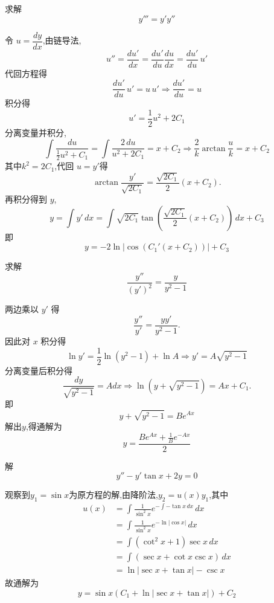 \begin{questions}
    \question 求解
    \[
    y''' = y'y''
    \]
    \begin{solution}
        令 $u=\dfrac{dy}{dx}$,由链导法,
        \[
        u'' = \frac{du'}{dx} = \frac{du'}{du}\frac{du}{dx} = \frac{du'}{du}\,u'
        \]
        代回方程得
        \[
        \frac{du'}{du}\,u' = u\,u' \Rightarrow \frac{du'}{du} = u
        \]
        积分得
        \[
        u' = \frac{1}{2}u^2 + 2C_1
        \]
        分离变量并积分,
        \[
        \int \frac{du}{\frac12 u^2 + C_1} = \int \frac{2\,du}{u^2 + 2C_1}= x + C_2 \Rightarrow \frac{2}{k}\arctan\!\frac{u}{k} = x + C_2
        \]
        其中$k^2 = 2C_1$,代回 $u=y'$得
        \[
        \arctan\frac{y'}{\sqrt{2C_1}} = \frac{\sqrt{2C_1}}{2}(x+C_2).
        \]
        再积分得到 $y$,
        \[
        y = \int y'\,dx = \int \sqrt{2C_1}\tan\left(\frac{\sqrt{2C_1}}{2}(x+C_2)\right)\,dx + C_3
        \]
        即
        \[
        y = -2\ln\left|\cos\left(C_1'(x+C_2)\right)\right| + C_3
        \]
    \end{solution}

    \question 求解
    \[
    \frac{y''}{(y')^2} = \frac{y}{y^2 - 1}
    \]
    \begin{solution}
        两边乘以 $y'$ 得
        \[
        \frac{y''}{y'} = \frac{y y'}{y^2 - 1}.
        \]
        因此对 $x$ 积分得
        \[
        \ln y' = \frac12 \ln(y^2-1) + \ln A \Rightarrow y' = A \sqrt{y^2 - 1}
        \]
        分离变量后积分得
        \[
        \frac{dy}{\sqrt{y^2-1}} = A dx \Rightarrow \ln(y + \sqrt{y^2-1}) = A x + C_1.
        \]
        即
        \[
        y + \sqrt{y^2-1} = B e^{A x}
        \]
        解出$y$,得通解为
        \[
        y = \frac{B e^{A x} + \frac{1}{B} e^{-A x}}{2}
        \]
    \end{solution}

    \question 解
    \[
    y'' - y'\tan x + 2y = 0
    \]
    \begin{solution}
        观察到$y_1=\sin x$为原方程的解,由降阶法,$y_2=u(x)y_1$,其中
        \begin{align*}
        u(x)&=\int \frac{1}{\sin^2 x} e^{-\int -\tan x\,dx}\, dx \\
        &=\int \frac{1}{\sin^2 x} e^{-\ln|\cos x|}\, dx \\
        &=\int (\cot^2 x+1)\sec x \, dx \\
        &=\int (\sec x+\cot x \csc x) \, dx \\
        &=\ln |\sec x + \tan x| -\csc x
        \end{align*}
        故通解为
        \[
        y=\sin x(C_1+\ln |\sec x + \tan x|)+C_2
        \]
    \end{solution}


\end{questions}
